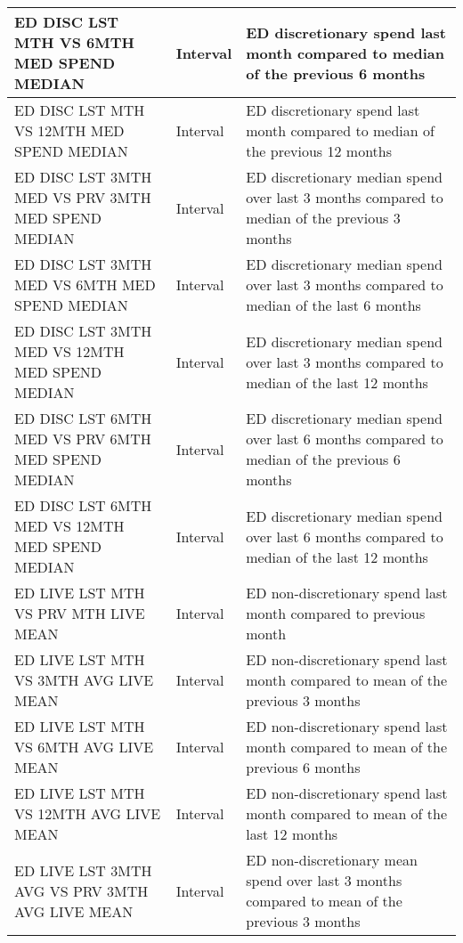\begin{longtable}{|p{5.5cm}|l|p{6.5cm}|}
	ED DISC LST MTH VS 6MTH MED SPEND MEDIAN            & Interval           & ED discretionary spend last month compared to median of the previous 6 months                    \\ \hline
	ED DISC LST MTH VS 12MTH MED SPEND MEDIAN           & Interval           & ED discretionary spend last month compared to median of the previous 12 months                   \\ \hline
	ED DISC LST 3MTH MED VS PRV 3MTH MED SPEND MEDIAN & Interval           & ED discretionary median spend over last 3 months compared to median of the previous 3 months     \\ \hline
	ED DISC LST 3MTH MED VS 6MTH MED SPEND MEDIAN      & Interval           & ED discretionary median spend over last 3 months compared to median of the last 6 months         \\ \hline
	ED DISC LST 3MTH MED VS 12MTH MED SPEND MEDIAN     & Interval           & ED discretionary median spend over last 3 months compared to median of the last 12 months        \\ \hline
	ED DISC LST 6MTH MED VS PRV 6MTH MED SPEND MEDIAN & Interval           & ED discretionary median spend over last 6 months compared to median of the previous 6 months     \\ \hline
	ED DISC LST 6MTH MED VS 12MTH MED SPEND MEDIAN     & Interval           & ED discretionary median spend over last 6 months compared to median of the last 12 months        \\ \hline
	ED LIVE LST MTH VS PRV MTH LIVE MEAN                & Interval           & ED non-discretionary spend last month compared to previous month                                 \\ \hline
	ED LIVE LST MTH VS 3MTH AVG LIVE MEAN               & Interval           & ED non-discretionary spend last month compared to mean of the previous 3 months                  \\ \hline
	ED LIVE LST MTH VS 6MTH AVG LIVE MEAN               & Interval           & ED non-discretionary spend last month compared to mean of the previous 6 months                  \\ \hline
	ED LIVE LST MTH VS 12MTH AVG LIVE MEAN              & Interval           & ED non-discretionary spend last month compared to mean of the last 12 months                     \\ \hline
	ED LIVE LST 3MTH AVG VS PRV 3MTH AVG LIVE MEAN    & Interval           & ED non-discretionary mean spend over last 3 months compared to mean of the previous 3 months     \\ \hline

\end{longtable}
